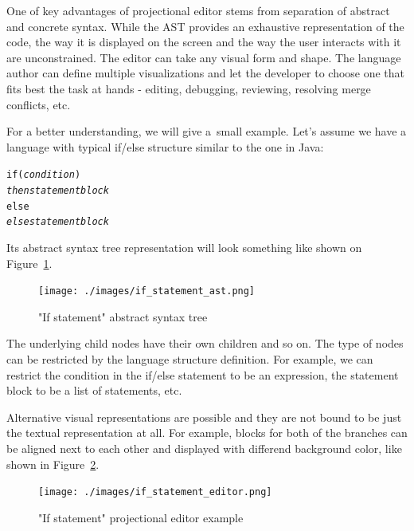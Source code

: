  One of key advantages of projectional editor stems from separation of abstract and concrete syntax. While the AST provides an exhaustive representation of the code, the way it is displayed on the screen and the way the user interacts with it are unconstrained. The editor can take any visual form and shape. The language author can define multiple visualizations and let the developer to choose one that fits best the task at hands - editing, debugging, reviewing, resolving merge conflicts, etc.

For a better understanding, we will give a~small example. Let's assume we have a language with typical if/else structure similar to the one in Java:

\begin{center}
	\begin{minipage}{.38\textwidth}
		\begin{alltt}
			if (\textit{condition})
			    \textit{then statement block}
			else
			    \textit{else statement block}
		\end{alltt}
	\end{minipage}
\end{center}

Its abstract syntax tree representation will look something like shown on Figure~\ref{fig:if_ast}.

\begin{figure}[ht]
  \centering
  \texttt{[image: ./images/if\_statement\_ast.png]}
  \caption{"If statement" abstract syntax tree}
  \label{fig:if_ast}
\end{figure}

The underlying child nodes have their own children and so on. The type of nodes can be restricted by the language structure definition. For example, we can restrict the condition in the if/else statement to be an expression, the statement block to be a list of statements, etc.

 Alternative visual representations are possible and they are not bound to be just the textual representation at all. For example, blocks for both of the branches can be aligned next to each other and displayed with differend background color, like shown in Figure~\ref{fig:if_editor}.

\begin{figure}[ht]
	\centering
	\hspace{-4mm}
	\texttt{[image: ./images/if\_statement\_editor.png]}
	\caption{"If statement" projectional editor example}
	\label{fig:if_editor}
\end{figure}

